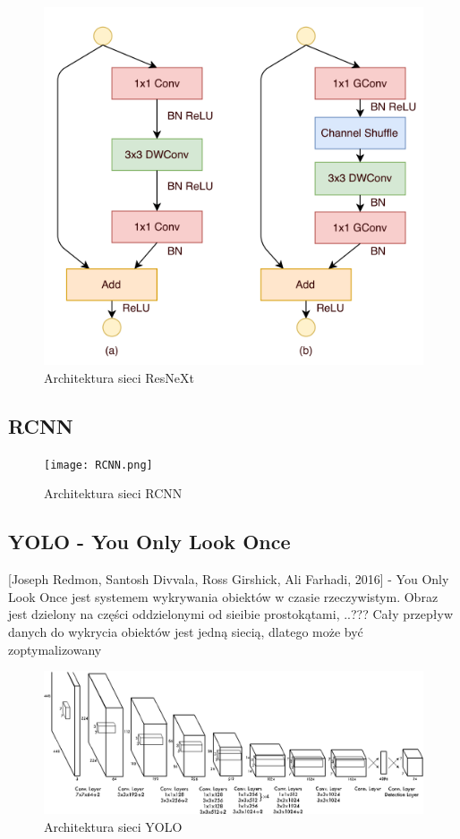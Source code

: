 \documentclass[a4paper,twoside,titlepage,openright]{book}
\begin{document}
\begin{figure}[h]
	\centering
			\includegraphics[resolution=120]{ResNeXt.png}
		\caption{Architektura sieci ResNeXt}
\end{figure}

\subsection{RCNN}
\begin{figure}[h]
	\centering
			\texttt{[image: RCNN.png]}
		\caption{Architektura sieci RCNN}
\end{figure}

\subsection{YOLO - You Only Look Once }
[Joseph Redmon, Santosh Divvala, Ross Girshick, Ali Farhadi, 2016] - You Only Look Once jest systemem wykrywania obiektów w czasie rzeczywistym. Obraz jest dzielony na części oddzielonymi od sieibie prostokątami, ..???
Cały przepływ danych do wykrycia obiektów jest jedną siecią, dlatego może być zoptymalizowany 
\begin{figure}[h]
	\centering
			\includegraphics[resolution=120]{YOLO.png}
		\caption{Architektura sieci YOLO}
\end{figure}
\end{document}
